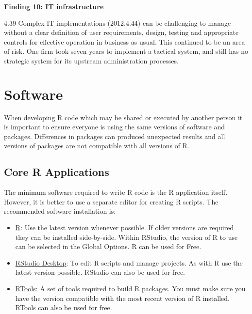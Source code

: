 \documentclass[]{book}
\providecommand{\tightlist}{%
  \setlength{\itemsep}{0pt}\setlength{\parskip}{0pt}}
\begin{document}
\textbf{Finding 10: IT infrastructure}

4.39 Complex IT implementations (2012.4.44) can be challenging to manage without a clear
definition of user requirements, design, testing and appropriate controls for effective
operation in business as usual. This continued to be an area of risk. One firm took seven
years to implement a tactical system, and still has no strategic system for its upstream
administration processes.

\hypertarget{software}{%
\chapter{Software}\label{software}}

When developing R code which may be shared or executed by another person it is important to
ensure everyone is using the same versions of software and packages. Differences in packages
can produced unexpected results and all versions of packages are not compatible with all versions
of R.

\hypertarget{core-r-applications}{%
\section{Core R Applications}\label{core-r-applications}}

The minimum software required to write R code is the R application itself. However, it is
better to use a separate editor for creating R scripts. The recommended software installation
is:

\begin{itemize}
\tightlist
\item
  \href{https://cloud.r-project.org/}{R}: Use the latest version whenever possible. If older versions
  are required they can be installed side-by-side. Within RStudio, the version of R to use can be
  selected in the Global Options. R can be used for Free.
\item
  \href{https://www.rstudio.com/products/rstudio/download/}{RStudio Desktop}: To edit R scripts
  and manage projects. As with R use the latest version possible. RStudio can also be used for
  free.
\item
  \href{https://cran.r-project.org/bin/windows/Rtools/}{RTools}: A set of tools required to build R
  packages. You must make sure you have the version compatible with the most recent version of R
  installed. RTools can also be used for free.
\end{itemize}
\end{document}
